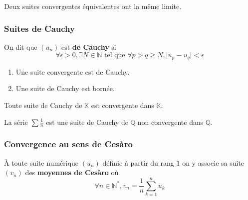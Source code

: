 
  \begin{proposition}
    Deux suites convergentes équivalentes ont la même limite.
  \end{proposition}

  \subsubsection{Suites de Cauchy}


  \begin{definition}
    On dit que $(u_n)$ est \textbf{de Cauchy} si
    \[ \forall \epsilon > 0, \exists N \in \mathbb{N} \text{ tel que } \forall p > q \geq N, \vert u_p - u_q \vert < \epsilon \]
  \end{definition}

  \begin{proposition}
    \begin{enumerate}[label={\bfseries(\roman*)}]
      \item Une suite convergente est de Cauchy.
      \item Une suite de Cauchy est bornée.
    \end{enumerate}
  \end{proposition}

  \begin{theorem}
    Toute suite de Cauchy de $\mathbb{K}$ est convergente dans $\mathbb{K}$.
  \end{theorem}


  \begin{cexample}
    La série $\sum \frac{1}{n}$ est une suite de Cauchy de $\mathbb{Q}$ non convergente dans $\mathbb{Q}$.
  \end{cexample}

  \subsubsection{Convergence au sens de Cesàro}


  \begin{definition}
    À toute suite numérique $(u_n)$ définie à partir du rang $1$ on y associe sa suite $(v_n)$ des \textbf{moyennes de Cesàro} où
    \[ \forall n \in \mathbb{N}^*, v_n = \frac{1}{n} \sum_{k=1}^{n} u_k \]
  \end{definition}

